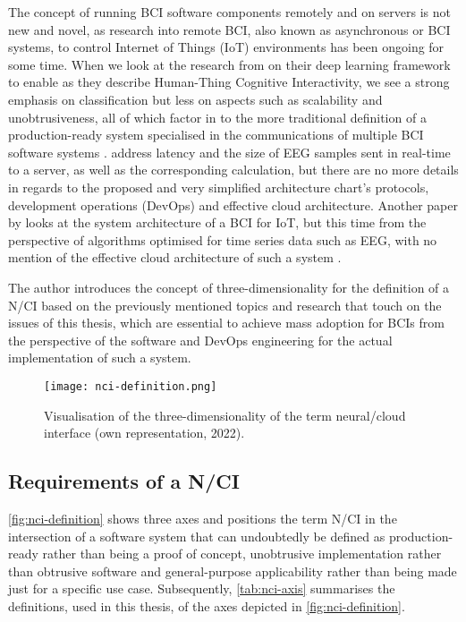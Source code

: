 The concept of running BCI software components remotely and on servers is not new and novel, as research into remote BCI, also known as asynchronous or BCI systems, to control Internet of Things (IoT) environments has been ongoing for some time. When we look at the research from \citeauthor{zhang_internet_2018} on their deep learning framework to enable as they describe Human-Thing Cognitive Interactivity, we see a strong emphasis on classification but less on aspects such as scalability and unobtrusiveness, all of which factor in to the more traditional definition of a production-ready system specialised in the communications of multiple BCI software systems \citep{zhang_internet_2018}. \citeauthor{zhang_internet_2018} address latency and the size of EEG samples sent in real-time to a server, as well as the corresponding calculation, but there are no more details in regards to the proposed and very simplified architecture chart's protocols, development operations (DevOps) and effective cloud architecture. Another paper by \citeauthor{ahamad_system_2022} looks at the system architecture of a BCI for IoT, but this time from the perspective of algorithms optimised for time series data such as EEG, with no mention of the effective cloud architecture of such a system \citep{ahamad_system_2022}.

The author introduces the concept of three-dimensionality for the definition of a N/CI based on the previously mentioned topics and research that touch on the issues of this thesis, which are essential to achieve mass adoption for BCIs from the perspective of the software and DevOps engineering for the actual implementation of such a system.

\begin{figure}[!ht]
  \centering
  \texttt{[image: nci-definition.png]}
  \caption{Visualisation of the three-dimensionality of the term neural/cloud interface (own representation, 2022).}
  \label{fig:nci-definition}
\end{figure}

\subsection{Requirements of a N/CI}
\label{chapter2-requirements-of-a-nci}

\autoref{fig:nci-definition} shows three axes and positions the term N/CI in the intersection of a software system that can undoubtedly be defined as production-ready rather than being a proof of concept, unobtrusive implementation rather than obtrusive software and general-purpose applicability rather than being made just for a specific use case. Subsequently, \autoref{tab:nci-axis} summarises the definitions, used in this thesis, of the axes depicted in \autoref{fig:nci-definition}.

